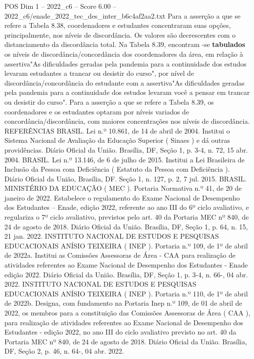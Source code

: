 \begin{textsample}{POS Dim 1 – 2022\_c6 – Score 6.00 – 2022\_c6/enade\_2022\_tec\_des\_inter\_b6c4af2aa2.txt}
Para a asserção a que se refere a Tabela 8.38, coordenadores e estudantes concentraram suas opções, principalmente, nos níveis de discordância.
Os valores são decrescentes com o distanciamento da discordância total.
Na Tabela 8.39, encontram -se \textbf{tabulados} os níveis de discordância/concordância dos coordenadores da área, em relação à assertiva"As dificuldades geradas pela pandemia para a continuidade dos estudos levaram estudantes a trancar ou desistir do curso", por nível de discordância/concordância do estudante com a assertiva"As dificuldades geradas pela pandemia para a continuidade dos estudos levaram você a pensar em trancar ou desistir do curso".
Para a asserção a que se refere a Tabela 8.39, os coordenadores e os estudantes optaram por níveis variados de concordância/discordância, com maiores concentrações nos níveis de discordância.
REFERÊNCIAS BRASIL.
Lei n.º 10.861, de 14 de abril de 2004.
Institui o Sistema Nacional de Avaliação da Educação Superior ( Sinaes ) e dá outras providências.
Diário Oficial da União.
Brasília, DF, Seção 1, p. 3-4, n. 72, 15 abr. 2004.
BRASIL.
Lei n.º 13.146, de 6 de julho de 2015.
Institui a Lei Brasileira de Inclusão da Pessoa com Deficiência ( Estatuto da Pessoa com Deficiência ).
Diário Oficial da União, Brasília, DF.
Seção 1, n. 127, p. 2, 7 jul. 2015.
BRASIL.
MINISTÉRIO DA EDUCAÇÃO ( MEC ).
Portaria Normativa n.º 41, de 20 de janeiro de 2022.
Estabelece o regulamento do Exame Nacional de Desempenho dos Estudantes – Enade, edição 2022, referente ao ano III do 6º ciclo avaliativo, e regulariza o 7º ciclo avaliativo, previstos pelo art. 40 da Portaria MEC nº 840, de 24 de agosto de 2018.
Diário Oficial da União.
Brasília, DF, Seção 1, p. 64, n. 15, 21 jan. 2022.
INSTITUTO NACIONAL DE ESTUDOS E PESQUISAS EDUCACIONAIS ANÍSIO TEIXEIRA ( INEP ).
Portaria n.º 109, de 1º de abril de 2022a.
Institui as Comissões Assessoras de Área - CAA para realização de atividades referentes ao Exame Nacional de Desempenho dos Estudantes - Enade edição 2022.
Diário Oficial da União.
Brasília, DF, Seção 1, p. 3-4, n. 66-, 04 abr. 2022.
INSTITUTO NACIONAL DE ESTUDOS E PESQUISAS EDUCACIONAIS ANÍSIO TEIXEIRA ( INEP ).
Portaria n.º 110, de 1º de abril de 2022b.
Designa, com fundamento na Portaria Inep n.º 109, de 01 de abril de 2022, os membros para a constituição das Comissões Assessoras de Área ( CAA ), para realização de atividades referentes ao Exame Nacional de Desempenho dos Estudantes - edição 2022, no ano III do ciclo avaliativo previsto no art. 40 da Portaria MEC nº 840, de 24 de agosto de 2018.
Diário Oficial da União.
Brasília, DF, Seção 2, p. 46, n. 64-, 04 abr. 2022.

\end{textsample}
